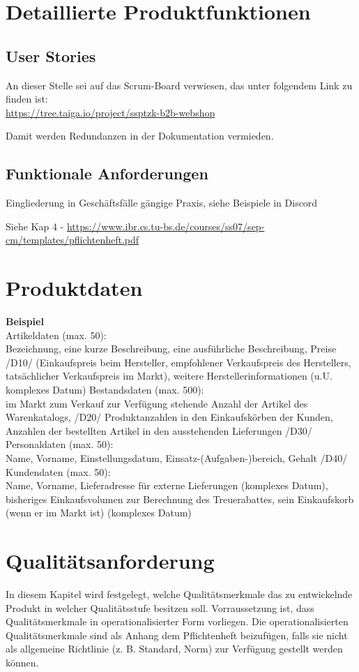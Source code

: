\documentclass[%
	ngerman,
	12pt,
	a4paper,
	oneside,
	parskip=full
]{scrbook}
\begin{document}
\chapter{Detaillierte Produktfunktionen}
\section{User Stories}
An dieser Stelle sei auf das Scrum-Board verwiesen, das unter folgendem Link zu finden ist: \\
\url{https://tree.taiga.io/project/ssptzk-b2b-webshop}

Damit werden Redundanzen in der Dokumentation vermieden.

\section{Funktionale Anforderungen}
Eingliederung in Geschäftsfälle gängige Praxis, siehe Beispiele in Discord

Siehe Kap 4 - \url{https://www.ibr.cs.tu-bs.de/courses/ss07/sep-cm/templates/pflichtenheft.pdf}


\chapter{Produktdaten}
\textbf{Beispiel} \\
Artikeldaten (max. 50):\\
Bezeichnung, eine kurze Beschreibung, eine ausführliche Beschreibung, Preise
/D10/
(Einkaufspreis beim Hersteller, empfohlener Verkaufspreis des Herstellers,
tatsächlicher Verkaufspreis im Markt), weitere Herstellerinformationen (u.U.
komplexes Datum)
Bestandsdaten (max. 500):\\
im Markt zum Verkauf zur Verfügung stehende Anzahl der Artikel des Warenkatalogs,
/D20/
Produktanzahlen in den Einkaufskörben der Kunden, Anzahlen der bestellten Artikel in
den ausstehenden Lieferungen
/D30/ Personaldaten (max. 50):\\
Name, Vorname, Einstellungsdatum, Einsatz-(Aufgaben-)bereich, Gehalt
/D40/ Kundendaten (max. 50):\\
Name, Vorname, Lieferadresse für externe Lieferungen (komplexes Datum), bisheriges
Einkaufsvolumen zur Berechnung des Treuerabattes, sein Einkaufskorb (wenn er im
Markt ist) (komplexes Datum)

\chapter{Qualitätsanforderung}
In diesem Kapitel wird festgelegt, welche Qualitätsmerkmale das zu entwickelnde Produkt in
welcher Qualitätsstufe besitzen soll. Vorraussetzung ist, dass Qualitätsmerkmale in
operationalisierter Form vorliegen. Die operationalisierten Qualitätsmerkmale sind als
Anhang dem Pflichtenheft beizufügen, falls sie nicht als allgemeine Richtlinie (z. B. Standard,
Norm) zur Verfügung gestellt werden können.
\end{document}
